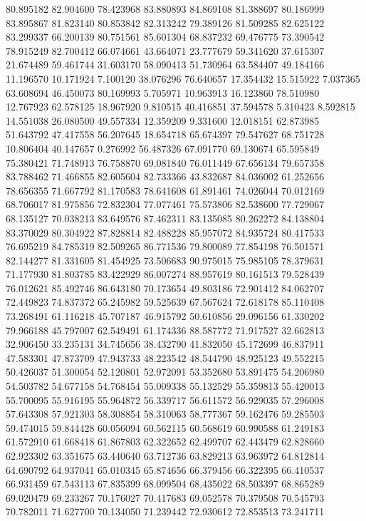 80.895182
82.904600
78.423968
83.880893
84.869108
81.388697
80.186999
83.895867
81.823140
80.853842
82.313242
79.389126
81.509285
82.625122
83.299337
66.200139
80.751561
85.601304
68.837232
69.476775
73.390542
78.915249
82.700412
66.074661
43.664071
23.777679
59.341620
37.615307
21.674489
59.461744
31.603170
58.090413
51.730964
63.584407
49.184166
11.196570
10.171924
7.100120
38.076296
76.640657
17.354432
15.515922
7.037365
63.608694
46.450073
80.169993
5.705971
10.963913
16.123860
78.510980
12.767923
62.578125
18.967920
9.810515
40.416851
37.594578
5.310423
8.592815
14.551038
26.080500
49.557334
12.359209
9.331600
12.018151
62.873985
51.643792
47.417558
56.207645
18.654718
65.674397
79.547627
68.751728
10.806404
40.147657
0.276992
56.487326
67.091770
69.130674
65.595849
75.380421
71.748913
76.758870
69.081840
76.011449
67.656134
79.657358
83.788462
71.466855
82.605604
82.733366
43.832687
84.036002
61.252656
78.656355
71.667792
81.170583
78.641608
61.891461
74.026044
70.012169
68.706017
81.975856
72.832304
77.077461
75.573806
82.538600
77.729067
68.135127
70.038213
83.649576
87.462311
83.135085
80.262272
84.138804
83.370029
80.304922
87.828814
82.488228
85.957072
84.935724
80.417533
76.695219
84.785319
82.509265
86.771536
79.800089
77.854198
76.501571
82.144277
81.331605
81.454925
73.506683
90.975015
75.985105
78.379631
71.177930
81.803785
83.422929
86.007274
88.957619
80.161513
79.528439
76.012621
85.492746
86.643180
70.173654
49.803186
72.901412
84.062707
72.449823
74.837372
65.245982
59.525639
67.567624
72.618178
85.110408
73.268491
61.116218
45.707187
46.915792
50.610856
29.096156
61.330202
79.966188
45.797007
62.549491
61.174336
88.587772
71.917527
32.662813
32.906450
33.235131
34.745656
38.432790
41.832050
45.172699
46.837911
47.583301
47.873709
47.943733
48.223542
48.544790
48.925123
49.552215
50.426037
51.300054
52.120801
52.972091
53.352680
53.891475
54.206980
54.503782
54.677158
54.768454
55.009338
55.132529
55.359813
55.420013
55.700095
55.916195
55.964872
56.339717
56.611572
56.929035
57.296008
57.643308
57.921303
58.308854
58.310063
58.777367
59.162476
59.285503
59.474015
59.844428
60.056094
60.562115
60.568619
60.990588
61.249183
61.572910
61.668418
61.867803
62.322652
62.499707
62.443479
62.828660
62.923302
63.351675
63.440640
63.712736
63.829213
63.963972
64.812814
64.690792
64.937041
65.010345
65.874656
66.379456
66.322395
66.410537
66.931459
67.543113
67.835399
68.099504
68.435022
68.503397
68.865289
69.020479
69.233267
70.176027
70.417683
69.052578
70.379508
70.545793
70.782011
71.627700
70.134050
71.239442
72.930612
72.853513
73.241711
